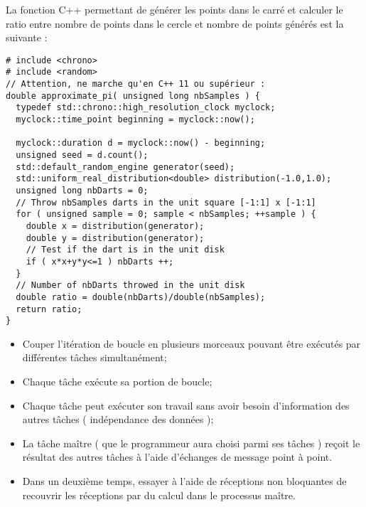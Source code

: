 \documentclass[11pt,a4paper]{article}
\begin{document}
La fonction C++ permettant de générer les points dans le carré et calculer le ratio entre nombre
de points dans le cercle et nombre de points générés est la suivante :

\begin{lstlisting}[style=customcpp]
# include <chrono>
# include <random>
// Attention, ne marche qu'en C++ 11 ou supérieur :
double approximate_pi( unsigned long nbSamples ) {
  typedef std::chrono::high_resolution_clock myclock;
  myclock::time_point beginning = myclock::now();

  myclock::duration d = myclock::now() - beginning;
  unsigned seed = d.count();
  std::default_random_engine generator(seed);
  std::uniform_real_distribution<double> distribution(-1.0,1.0);
  unsigned long nbDarts = 0;
  // Throw nbSamples darts in the unit square [-1:1] x [-1:1]
  for ( unsigned sample = 0; sample < nbSamples; ++sample ) {
    double x = distribution(generator);
    double y = distribution(generator);
    // Test if the dart is in the unit disk
    if ( x*x+y*y<=1 ) nbDarts ++;
  }
  // Number of nbDarts throwed in the unit disk
  double ratio = double(nbDarts)/double(nbSamples);
  return ratio;
}
\end{lstlisting}

\begin{itemize}
\item Couper l'itération de boucle en plusieurs morceaux pouvant être exécutés par différentes tâches
simultanément;
\item Chaque tâche exécute sa portion de boucle;
\item Chaque tâche peut exécuter son travail sans avoir besoin d'information des autres tâches ( indépendance
des données );
\item La tâche maître ( que le programmeur aura choisi parmi ses tâches ) reçoit le résultat des autres
tâches à l'aide d'échanges de message point à point.
\item Dans un deuxième temps, essayer à l'aide de réceptions non bloquantes de recouvrir les réceptions par du
calcul dans le processus maître.
\end{itemize}

\begin{center}
\end{center}
\end{document}
